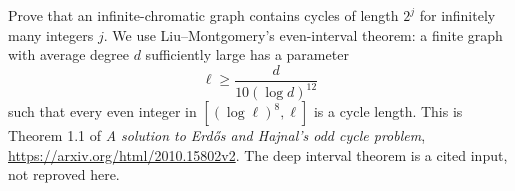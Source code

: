 Prove that an infinite-chromatic graph contains cycles of length $2^j$ for infinitely many integers $j$. We use Liu--Montgomery's even-interval theorem: a finite graph with average degree $d$ sufficiently large has a parameter
\[
 \ell\ge\frac{d}{10(\log d)^{12}}
\]
such that every even integer in $[(\log\ell)^8,\ell]$ is a cycle length. This is Theorem 1.1 of \emph{A solution to Erd\H{o}s and Hajnal's odd cycle problem}, \url{https://arxiv.org/html/2010.15802v2}. The deep interval theorem is a cited input, not reproved here.
